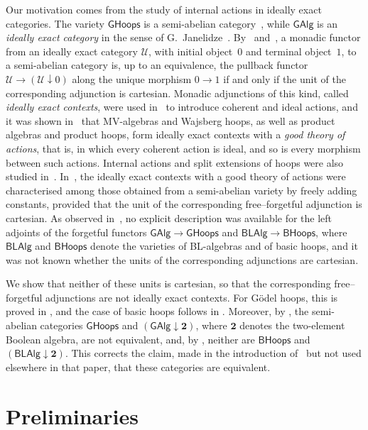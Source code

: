 \documentclass[reqno,a4paper]{amsart}
\theoremstyle{plain}
\theoremstyle{definition}
\theoremstyle{remark}
\numberwithin{equation}{section}
\newcommand{\two}{\mathbf{2}}
\newcommand{\GHoops}{\ensuremath{\mathsf{GHoops}}}
\newcommand{\GAlg}{\ensuremath{\mathsf{GAlg}}}
\newcommand{\BHoops}{\ensuremath{\mathsf{BHoops}}}
\newcommand{\BLAlg}{\ensuremath{\mathsf{BLAlg}}}
\begin{document}
Our motivation comes from the study of internal actions in ideally exact categories. The variety $\GHoops$ is a semi-abelian category~\cite{JMT,LMS}, while $\GAlg$ is an \emph{ideally exact category} in the sense of G.~Janelidze~\cite{IdeallyExact}. By~\cite{IdeallyExact} and~\cite[Remark~3.3]{MMP}, a monadic functor from an ideally exact category $\mathcal{U}$, with initial object~$0$ and terminal object~$1$, to a semi-abelian category is, up to an equivalence, the pullback functor $\mathcal{U}\to(\mathcal{U}\downarrow0)$ along the unique morphism $0\to1$ if and only if the unit of the corresponding adjunction is cartesian. Monadic adjunctions of this kind, called \emph{ideally exact contexts}, were used in~\cite{MMP} to introduce coherent and ideal actions, and it was shown in~\cite[Theorems~6.30 and~6.39]{MMP} that MV-algebras and Wajsberg hoops, as well as product algebras and product hoops, form ideally exact contexts with a \emph{good theory of actions}, that is, in which every coherent action is ideal, and so is every morphism between such actions. Internal actions and split extensions of hoops were also studied in~\cite{MMPStudia,MMPT}. In~\cite{MP}, the ideally exact contexts with a good theory of actions were characterised among those obtained from a semi-abelian variety by freely adding constants, provided that the unit of the corresponding free--forgetful adjunction is cartesian. As observed in~\cite[Section~4]{MP}, no explicit description was available for the left adjoints of the forgetful functors $\GAlg\to\GHoops$ and $\BLAlg\to\BHoops$, where $\BLAlg$ and $\BHoops$ denote the varieties of BL-algebras and of basic hoops, and it was not known whether the units of the corresponding adjunctions are cartesian.

We show that neither of these units is cartesian, so that the corresponding free--forgetful adjunctions are not ideally exact contexts. For G\"odel hoops, this is proved in , and the case of basic hoops follows in . Moreover, by , the semi-abelian categories $\GHoops$ and $(\GAlg\downarrow\two)$, where $\two$ denotes the two-element Boolean algebra, are not equivalent, and, by , neither are $\BHoops$ and $(\BLAlg\downarrow\two)$. This corrects the claim, made in the introduction of~\cite{MMPStudia} but not used elsewhere in that paper, that these categories are equivalent.

\section{Preliminaries}\label{SecPrelim}
\end{document}
